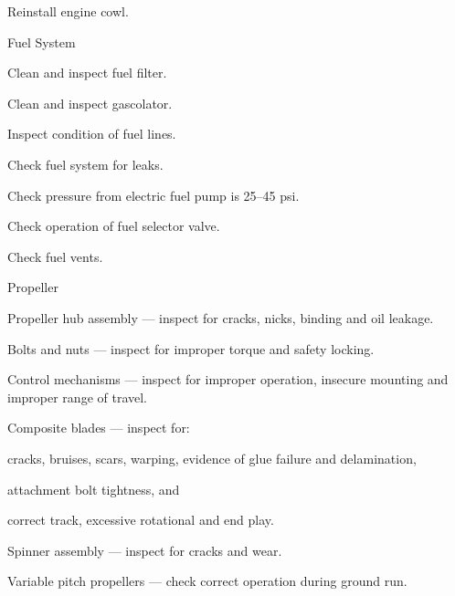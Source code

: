 \begin{enumerate*}
\begin{enumerate*}
		\item Reinstall engine cowl. 
	\end{enumerate*}
	\item{Fuel System} 
	\begin{enumerate*}
		\item Clean and inspect fuel filter. 
		\item Clean and inspect gascolator. 
		\item Inspect condition of fuel lines.
		\item Check fuel system for leaks.
		\item Check pressure from electric fuel pump is 25--45 psi. 
		\item Check operation of fuel selector valve.
		\item Check fuel vents.
	\end{enumerate*}

	\item{Propeller} 
	\begin{enumerate*}
	  \item Propeller hub assembly --- inspect for cracks, nicks, binding and oil leakage.
	  \item Bolts and nuts --- inspect for improper torque and safety locking.
	  \item Control mechanisms --- inspect for improper operation, insecure mounting and improper range of travel.
	  \item Composite blades --- inspect for:
	  \begin{enumerate*}
	    \item cracks, bruises, scars, warping, evidence of glue failure and delamination,
	    \item attachment bolt tightness, and
	    \item correct track, excessive rotational and end play.

  	  \end{enumerate*}
  	\item Spinner assembly --- inspect for cracks and wear.
  	\item Variable pitch propellers --- check correct operation during ground run.
	\end{enumerate*}



\end{enumerate*}

